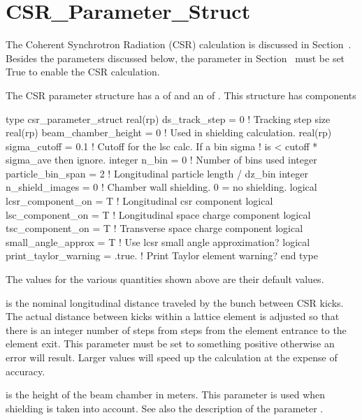 {{{{{{{{{%
\section{CSR_Parameter_Struct}
\label{s:csr.params}

The Coherent Synchrotron Radiation (CSR) calculation is discussed in
Section~. Besides the parameters discussed below, the
 parameter in Section~
must be set True to enable the CSR calculation.

The CSR parameter structure has a 
of  and an  of .
This structure has components
\begin{example}
  type csr_parameter_struct 
    real(rp) ds_track_step = 0        ! Tracking step size
    real(rp) beam_chamber_height = 0  ! Used in shielding calculation.
    real(rp) sigma_cutoff = 0.1       ! Cutoff for the lsc calc. If a bin sigma
                                      !  is < cutoff * sigma_ave then ignore.
    integer n_bin = 0                 ! Number of bins used
    integer particle_bin_span = 2     ! Longitudinal particle length / dz_bin
    integer n_shield_images = 0       ! Chamber wall shielding. 0 = no shielding.
    logical lcsr_component_on = T     ! Longitudinal csr component
    logical lsc_component_on = T      ! Longitudinal space charge component
    logical tsc_component_on = T      ! Transverse space charge component
    logical small_angle_approx = T    ! Use lcsr small angle approximation?
    logical print_taylor_warning = .true. ! Print Taylor element warning?
  end type
\end{example}
The values for the various quantities shown above are their default values. 

 is the nominal longitudinal distance traveled by
the bunch between CSR kicks. The actual distance between kicks within
a lattice element is adjusted so that there is an integer number of
steps from steps from the element entrance to the element exit.  This
parameter must be set to something positive otherwise an error will
result. Larger values will speed up the calculation at the expense of
accuracy.

 is the height of the beam chamber in
meters. This parameter is used when shielding is taken into account.
See also the description of the parameter .

}}}}}}}}}
